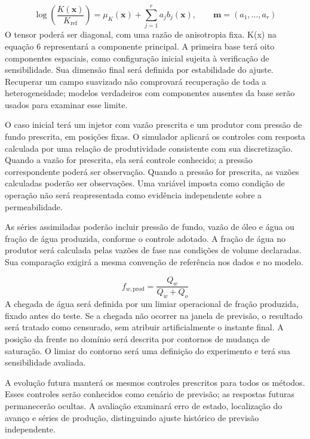 \documentclass[12pt,a4paper]{article}
\begin{document}
\begin{equation}
\log\!\left(\frac{K(\mathbf x)}{K_{\mathrm{ref}}}\right)=\mu_K(\mathbf x)+\sum_{j=1}^{r}a_jb_j(\mathbf x),\qquad \mathbf m=(a_1,\ldots,a_r)
\end{equation}
O tensor poderá ser diagonal, com uma razão de anisotropia fixa. K(x) na equação 6 representará a componente principal. A primeira base terá oito componentes espaciais, como configuração inicial sujeita à verificação de sensibilidade. Sua dimensão final será definida por estabilidade do ajuste. Recuperar um campo suavizado não comprovará recuperação de toda a heterogeneidade; modelos verdadeiros com componentes ausentes da base serão usados para examinar esse limite.\par
O caso inicial terá um injetor com vazão prescrita e um produtor com pressão de fundo prescrita, em posições fixas. O simulador aplicará os controles com resposta calculada por uma relação de produtividade consistente com sua discretização. Quando a vazão for prescrita, ela será controle conhecido; a pressão correspondente poderá ser observação. Quando a pressão for prescrita, as vazões calculadas poderão ser observações. Uma variável imposta como condição de operação não será reapresentada como evidência independente sobre a permeabilidade.\par
As séries assimiladas poderão incluir pressão de fundo, vazão de óleo e água ou fração de água produzida, conforme o controle adotado. A fração de água no produtor será calculada pelas vazões de fase nas condições de volume declaradas. Sua comparação exigirá a mesma convenção de referência nos dados e no modelo.\par

\begin{equation}
f_{w,\mathrm{prod}}=\frac{Q_w}{Q_w+Q_o}
\end{equation}
A chegada de água será definida por um limiar operacional de fração produzida, fixado antes do teste. Se a chegada não ocorrer na janela de previsão, o resultado será tratado como censurado, sem atribuir artificialmente o instante final. A posição da frente no domínio será descrita por contornos de mudança de saturação. O limiar do contorno será uma definição do experimento e terá sua sensibilidade avaliada.\par
A evolução futura manterá os mesmos controles prescritos para todos os métodos. Esses controles serão conhecidos como cenário de previsão; as respostas futuras permanecerão ocultas. A avaliação examinará erro de estado, localização do avanço e séries de produção, distinguindo ajuste histórico de previsão independente.\par
\end{document}
